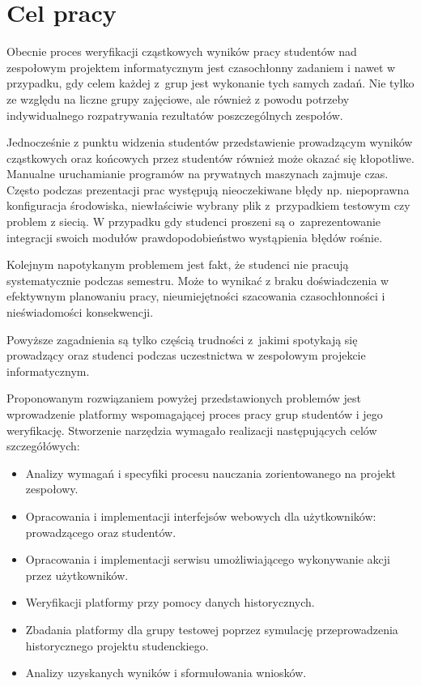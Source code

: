 \chapter{Cel pracy}

Obecnie proces weryfikacji cząstkowych wyników pracy studentów nad zespołowym projektem informatycznym jest czasochłonny zadaniem i nawet w przypadku, gdy celem każdej z~grup jest wykonanie tych samych zadań.
Nie tylko ze względu na liczne grupy zajęciowe, ale również z powodu potrzeby indywidualnego rozpatrywania rezultatów poszczególnych zespołów.

Jednocześnie z punktu widzenia studentów przedstawienie prowadzącym wyników cząstkowych oraz końcowych przez studentów również może okazać się kłopotliwe.
Manualne uruchamianie programów na prywatnych maszynach zajmuje czas.
Często podczas prezentacji prac występują nieoczekiwane błędy np. niepoprawna konfiguracja środowiska, niewłaściwie wybrany plik z~przypadkiem testowym czy problem z siecią.
W przypadku gdy studenci proszeni są o~zaprezentowanie integracji swoich modułów prawdopodobieństwo wystąpienia błędów rośnie.

Kolejnym napotykanym problemem jest fakt, że studenci nie pracują systematycznie podczas semestru.
Może to wynikać z braku doświadczenia w efektywnym planowaniu pracy, nieumiejętności szacowania czasochłonności i nieświadomości konsekwencji.

Powyższe zagadnienia są tylko częścią trudności z~jakimi spotykają się prowadzący oraz studenci podczas uczestnictwa w zespołowym projekcie informatycznym.

Proponowanym rozwiązaniem powyżej przedstawionych problemów jest wprowadzenie platformy wspomagającej proces pracy grup studentów i jego weryfikację.
Stworzenie narzędzia wymagało realizacji następujących celów szczegółówych:
\begin{itemize}
    \item Analizy wymagań i specyfiki procesu nauczania zorientowanego na projekt zespołowy.
    \item Opracowania i implementacji interfejsów webowych dla użytkowników: prowadzącego oraz studentów.
    \item Opracowania i implementacji serwisu umożliwiającego wykonywanie akcji przez użytkowników.
    \item Weryfikacji platformy przy pomocy danych historycznych.
    \item Zbadania platformy dla grupy testowej poprzez symulację przeprowadzenia historycznego projektu studenckiego.
    \item Analizy uzyskanych wyników i sformułowania wniosków.
\end{itemize}

